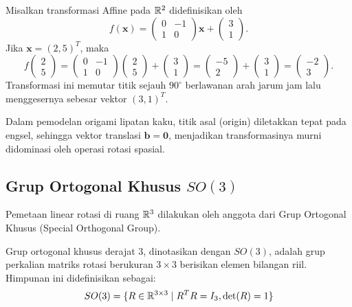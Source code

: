 \begin{contoh}
  Misalkan transformasi Affine pada $\mathbb{R}^2$ didefinisikan oleh
  \[
    f(\mathbf{x}) = \begin{pmatrix} 0 & -1 \\ 1 & 0 \end{pmatrix} \mathbf{x} + \begin{pmatrix} 3 \\ 1 \end{pmatrix}.
  \]
  Jika $\mathbf{x} = (2, 5)^T$, maka
  \[
    f\!\begin{pmatrix} 2 \\ 5 \end{pmatrix} = \begin{pmatrix} 0 & -1 \\ 1 & 0 \end{pmatrix} \begin{pmatrix} 2 \\ 5 \end{pmatrix} + \begin{pmatrix} 3 \\ 1 \end{pmatrix} = \begin{pmatrix} -5 \\ 2 \end{pmatrix} + \begin{pmatrix} 3 \\ 1 \end{pmatrix} = \begin{pmatrix} -2 \\ 3 \end{pmatrix}.
  \]
  Transformasi ini memutar titik sejauh $90^\circ$ berlawanan arah jarum jam lalu menggesernya sebesar vektor $(3, 1)^T$.
\end{contoh}

Dalam pemodelan origami lipatan kaku, titik asal (origin) diletakkan tepat pada engsel, sehingga vektor translasi $\mathbf{b} = \mathbf{0}$, menjadikan transformasinya murni didominasi oleh operasi rotasi spasial.

\subsection{Grup Ortogonal Khusus $SO(3)$}
Pemetaan linear rotasi di ruang $\mathbb{R}^3$ dilakukan oleh anggota dari Grup Ortogonal Khusus (Special Orthogonal Group).
\begin{definisi}
  Grup ortogonal khusus derajat 3, dinotasikan dengan $SO(3)$, adalah grup perkalian matriks rotasi berukuran $3 \times 3$ berisikan elemen bilangan riil. Himpunan ini didefinisikan sebagai:
  \[
    SO(3) = \{ R \in \mathbb{R}^{3 \times 3} \mid R^T R = I_3, \det(R) = 1 \}
  \]
\end{definisi}

